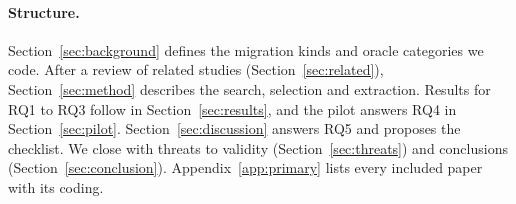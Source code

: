 \begin{added}
\paragraph{Structure.} Section~\ref{sec:background} defines the migration kinds and oracle categories we code. After a review of related studies (Section~\ref{sec:related}), Section~\ref{sec:method} describes the search, selection and extraction. Results for RQ1 to RQ3 follow in Section~\ref{sec:results}, and the pilot answers RQ4 in Section~\ref{sec:pilot}. Section~\ref{sec:discussion} answers RQ5 and proposes the checklist. We close with threats to validity (Section~\ref{sec:threats}) and conclusions (Section~\ref{sec:conclusion}). Appendix~\ref{app:primary} lists every included paper with its coding.
\end{added}